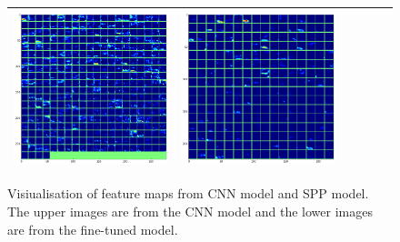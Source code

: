 \begin{figure}[!htb]
\begin{center}
\begin{tabular}{|c|c|c|c|c|c|}
\includegraphics[scale=0.1]{sunny2_conv4_fm.png} &
\includegraphics[scale=0.1]{sunny2_conv5_fm.png}\\ \hline\hline
\end{tabular}

\end{center}
	\caption{Visiualisation of feature maps from CNN model and SPP model. The upper images are from the CNN model and the lower images are from the fine-tuned model.}
	\label{fig:diff_featuremap}%
\end{figure}

